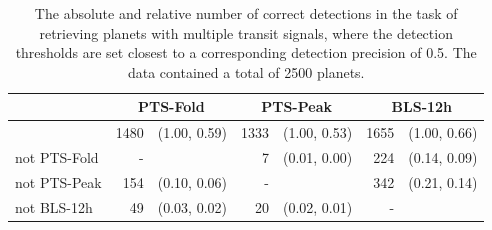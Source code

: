 \begin{table}[h]
\label{tab:single_AnotB}
\centering
\begin{tabular}{@{}lrlrlrl@{}}
\toprule
             & \multicolumn{2}{c}{PTS-Fold} & \multicolumn{2}{c}{PTS-Peak} & \multicolumn{2}{c}{BLS-12h} \\ \midrule
             & 1480      & (1.00, 0.59)     & 1333      & (1.00, 0.53)     & 1655     & (1.00, 0.66)     \\
not PTS-Fold & -         &                  & 7         & (0.01, 0.00)     & 224      & (0.14, 0.09)     \\
not PTS-Peak & 154       & (0.10, 0.06)     & -         &                  & 342      & (0.21, 0.14)     \\
not BLS-12h  & 49        & (0.03, 0.02)     & 20        & (0.02, 0.01)     & -        &                  \\ \bottomrule
\end{tabular}
\caption{The absolute and relative number of correct detections in the task of retrieving planets with multiple transit signals, where the detection thresholds are set closest to a corresponding detection precision of 0.5.  The data contained a total of 2500 planets.}
\end{table}